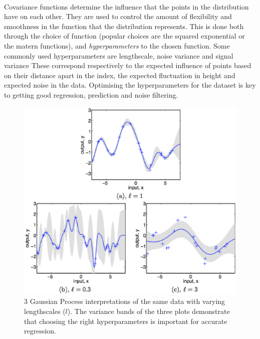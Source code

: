 	\paragraph{}
	Covariance functions determine the influence that the points in the distribution have on each other. They are used to control the amount of flexibility and smoothness in the function that the distribution represents. This is done both through the choice of function (popular choices are the squared exponential or the matern functions), and \emph{hyperparameters} to the chosen function. Some commonly used hyperparameters are lengthscale, noise variance and signal variance These correspond respectively to the expected influence of points based on their distance apart in the index, the expected fluctuation in height and expected noise in the data. Optimising the hyperparameters for the dataset is key to getting good regression, prediction and noise filtering.

	\begin{figure}[ht!]
	\centering
	\includegraphics[width=140mm]{images/covariance.eps}
	\caption{3 Gaussian Process interpretations of the same data with varying lengthscales ($l$). The variance bands of the three plots demonstrate that choosing the right hyperparameters is important for accurate regression.}
	\label{gaussianprocesshyperparameters}
	\end{figure}
	

	
